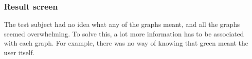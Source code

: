 \subsubsection{Result screen}
The test subject had no idea what any of the graphs meant, and all the graphs
seemed overwhelming. To solve this, a lot more information has to be
associated with each graph. For example, there was no way of knowing that green
meant the user itself. 


